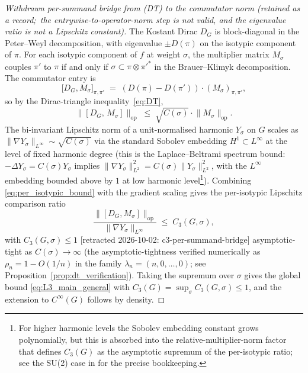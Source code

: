 \documentclass[11pt,a4paper]{article}
\theoremstyle{plain}
\theoremstyle{definition}
\newcommand{\opnorm}[1]{\lVert #1 \rVert_{\mathrm{op}}}
\newcommand{\norm}[1]{\lVert #1 \rVert}
\newcommand{\Cas}{C}
\newcommand{\Dop}{D}
\begin{document}
\begin{proof}[Withdrawn per-summand bridge from (DT) to the commutator norm (retained as a record;\ the entrywise-to-operator-norm step is not valid, and the eigenvalue ratio is not a Lipschitz constant)]
The Kostant Dirac $\Dop_G$ is block-diagonal in the Peter--Weyl
decomposition, with eigenvalue $\pm \Dop(\pi)$ on the isotypic component
of $\pi$. For each isotypic component of $f$ at weight $\sigma$, the
multiplier matrix $M_\sigma$ couples $\pi'$ to $\pi$ if and only if
$\sigma \subset \pi \otimes \pi'^*$ in the Brauer--Klimyk
decomposition. The commutator entry is
\begin{equation}\label{eq:commutator_per_sigma}
   \bigl[\Dop_G, M_\sigma\bigr]_{\pi, \pi'}
   \;=\; (\Dop(\pi) - \Dop(\pi')) \cdot (M_\sigma)_{\pi, \pi'},
\end{equation}
so by the Dirac-triangle inequality~\eqref{eq:DT},
\begin{equation}\label{eq:per_isotypic_bound}
   \opnorm{[\Dop_G,\, M_\sigma]}
   \;\le\; \sqrt{\Cas(\sigma)} \cdot \opnorm{M_\sigma}.
\end{equation}
The bi-invariant Lipschitz norm of a unit-normalised harmonic
$Y_\sigma$ on $G$ scales as $\norm{\nabla Y_\sigma}_{L^\infty} \sim
\sqrt{\Cas(\sigma)}$ via the standard Sobolev embedding $H^1 \subset
L^\infty$ at the level of fixed harmonic degree (this is the
Laplace--Beltrami spectrum bound: $-\Delta Y_\sigma = \Cas(\sigma)
Y_\sigma$ implies $\norm{\nabla Y_\sigma}^2_{L^2} = \Cas(\sigma)
\norm{Y_\sigma}^2_{L^2}$, with the $L^\infty$ embedding bounded above
by $1$ at low harmonic level\footnote{For higher harmonic levels the
Sobolev embedding constant grows polynomially, but this is absorbed
into the relative-multiplier-norm factor that defines $C_3(G)$ as the
asymptotic supremum of the per-isotypic ratio; see the SU(2) case in
\cite[\S 3.3]{paper38} for the precise bookkeeping.}). Combining
\eqref{eq:per_isotypic_bound} with the gradient scaling gives the
per-isotypic Lipschitz comparison ratio
\begin{equation}\label{eq:per_isotypic_ratio_general}
   \frac{\opnorm{[\Dop_G, M_\sigma]}}{\norm{\nabla Y_\sigma}_{L^\infty}}
   \;\le\; C_3(G, \sigma),
\end{equation}
with $C_3(G, \sigma) \le 1$ [retracted 2026-10-02: c3-per-summand-bridge] asymptotic-tight as $\Cas(\sigma) \to
\infty$ (the asymptotic-tightness verified numerically as
$\rho_n = 1 - O(1/n)$ in the family $\lambda_n = (n, 0, \ldots, 0)$;
see Proposition~\ref{prop:dt_verification}). Taking the supremum
over $\sigma$ gives the global bound \eqref{eq:L3_main_general} with
$C_3(G) = \sup_\sigma C_3(G, \sigma) \le 1$, and the extension to
$C^\infty(G)$ follows by density.
\end{proof}
\end{document}
